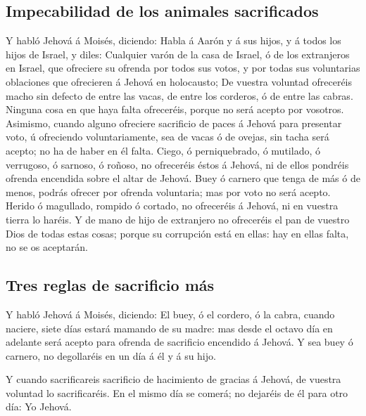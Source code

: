 \hypertarget{impecabilidad-de-los-animales-sacrificados}{%
\subsection{Impecabilidad de los animales
sacrificados}\label{impecabilidad-de-los-animales-sacrificados}}

 Y habló Jehová á Moisés, diciendo:  Habla
á Aarón y á sus hijos, y á todos los hijos de Israel, y diles: Cualquier
varón de la casa de Israel, ó de los extranjeros en Israel, que
ofreciere su ofrenda por todos sus votos, y por todas sus voluntarias
oblaciones que ofrecieren á Jehová en holocausto;  De
vuestra voluntad ofreceréis macho sin defecto de entre las vacas, de
entre los corderos, ó de entre las cabras.  Ninguna cosa
en que haya falta ofreceréis, porque no será acepto por vosotros.
 Asimismo, cuando alguno ofreciere sacrificio de paces á
Jehová para presentar voto, ú ofreciendo voluntariamente, sea de vacas ó
de ovejas, sin tacha será acepto; no ha de haber en él falta.
 Ciego, ó perniquebrado, ó mutilado, ó verrugoso, ó
sarnoso, ó roñoso, no ofreceréis éstos á Jehová, ni de ellos pondréis
ofrenda encendida sobre el altar de Jehová.  Buey ó
carnero que tenga de más ó de menos, podrás ofrecer por ofrenda
voluntaria; mas por voto no será acepto.  Herido ó
magullado, rompido ó cortado, no ofreceréis á Jehová, ni en vuestra
tierra lo haréis.  Y de mano de hijo de extranjero no
ofreceréis el pan de vuestro Dios de todas estas cosas; porque su
corrupción está en ellas: hay en ellas falta, no se os aceptarán.

\hypertarget{tres-reglas-de-sacrificio-muxe1s}{%
\subsection{Tres reglas de sacrificio
más}\label{tres-reglas-de-sacrificio-muxe1s}}

 Y habló Jehová á Moisés, diciendo:  El
buey, ó el cordero, ó la cabra, cuando naciere, siete días estará
mamando de su madre: mas desde el octavo día en adelante será acepto
para ofrenda de sacrificio encendido á Jehová.  Y sea
buey ó carnero, no degollaréis en un día á él y á su hijo.

 Y cuando sacrificareis sacrificio de hacimiento de
gracias á Jehová, de vuestra voluntad lo sacrificaréis. 
En el mismo día se comerá; no dejaréis de él para otro día: Yo Jehová.

